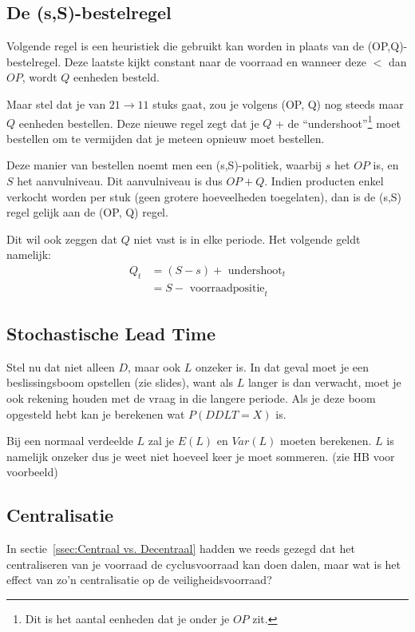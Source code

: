\subsection{De (s,S)-bestelregel}
\label{sub:Variant op Bestelregel}
Volgende regel is een heuristiek die gebruikt kan worden in plaats van de (OP,Q)-bestelregel. Deze laatste kijkt constant naar de voorraad en wanneer deze $<$ dan $OP$, wordt $Q$ eenheden besteld.

Maar stel dat je van $21\rightarrow 11$ stuks gaat, zou je volgens (OP, Q) nog steeds maar $Q$ eenheden bestellen. Deze nieuwe regel zegt dat je $Q$ + de ``undershoot''\footnote{Dit is het aantal eenheden dat je onder je $OP$ zit.} moet bestellen om te vermijden dat je meteen opnieuw moet bestellen.

Deze manier van bestellen noemt men een (s,S)-politiek, waarbij $s$ het $OP$ is, en $S$ het aanvulniveau. Dit aanvulniveau is dus $OP + Q$. Indien producten enkel verkocht worden per stuk (geen grotere hoeveelheden toegelaten), dan is de (s,S) regel gelijk aan de (OP, Q) regel.

Dit wil ook zeggen dat $Q$ niet vast is in elke periode. Het volgende geldt namelijk:
\begin{align*}
    Q_t &= (S - s) + \text{ undershoot}_t \\
    &= S - \text{ voorraadpositie}_t
\end{align*}


\subsection{Stochastische Lead Time}
\label{sub:Stochastische Lead Time}
Stel nu dat niet alleen $D$, maar ook $L$ onzeker is. In dat geval moet je een beslissingsboom opstellen (zie slides), want als $L$ langer is dan verwacht, moet je ook rekening houden met de vraag in die langere periode. Als je deze boom opgesteld hebt kan je berekenen wat $P(DDLT = X)$ is.

Bij een normaal verdeelde $L$ zal je $E(L)$ en $Var(L)$ moeten berekenen. $L$ is namelijk onzeker dus je weet niet hoeveel keer je moet sommeren. (zie HB voor voorbeeld)


\subsection{Centralisatie}
\label{sub:Centralisatie}
In sectie~\ref{ssec:Centraal vs. Decentraal} hadden we reeds gezegd dat het centraliseren van je voorraad de cyclusvoorraad kan doen dalen, maar wat is het effect van zo'n centralisatie op de veiligheidsvoorraad?

